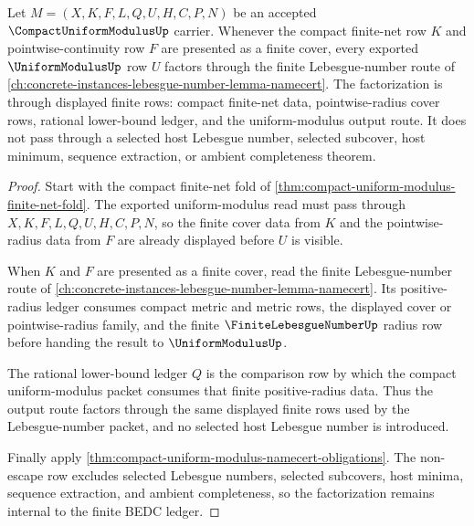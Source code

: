 \begin{theorem}
\label{thm:compact-uniform-continuity-lebesgue-number-factorization}
Let $M=(X,K,F,L,Q,U,H,C,P,N)$ be an accepted $\CompactUniformModulusUp$ carrier. Whenever the compact finite-net row $K$ and pointwise-continuity row $F$ are presented as a finite cover, every exported $\UniformModulusUp$ row $U$ factors through the finite Lebesgue-number route of \autoref{ch:concrete-instances-lebesgue-number-lemma-namecert}. The factorization is through displayed finite rows: compact finite-net data, pointwise-radius cover rows, rational lower-bound ledger, and the uniform-modulus output route. It does not pass through a selected host Lebesgue number, selected subcover, host minimum, sequence extraction, or ambient completeness theorem.
\end{theorem}
\begin{proof}
Start with the compact finite-net fold of \autoref{thm:compact-uniform-modulus-finite-net-fold}. The exported uniform-modulus read must pass through $X,K,F,L,Q,U,H,C,P,N$, so the finite cover data from $K$ and the pointwise-radius data from $F$ are already displayed before $U$ is visible.

When $K$ and $F$ are presented as a finite cover, read the finite Lebesgue-number route of \autoref{ch:concrete-instances-lebesgue-number-lemma-namecert}. Its positive-radius ledger consumes compact metric and metric rows, the displayed cover or pointwise-radius family, and the finite $\FiniteLebesgueNumberUp$ radius row before handing the result to $\UniformModulusUp$.

The rational lower-bound ledger $Q$ is the comparison row by which the compact uniform-modulus packet consumes that finite positive-radius data. Thus the output route factors through the same displayed finite rows used by the Lebesgue-number packet, and no selected host Lebesgue number is introduced.

Finally apply \autoref{thm:compact-uniform-modulus-namecert-obligations}. The non-escape row excludes selected Lebesgue numbers, selected subcovers, host minima, sequence extraction, and ambient completeness, so the factorization remains internal to the finite BEDC ledger.
\end{proof}

